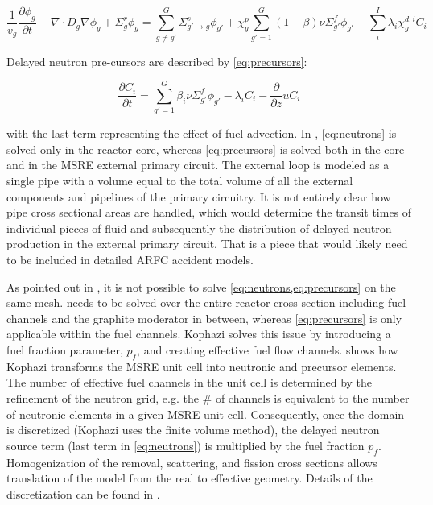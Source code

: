 \documentclass{article}
\begin{document}
\begin{equation}
\frac{1}{v_g}\frac{\partial \phi_g}{\partial t} - \nabla \cdot D_g \nabla \phi_g
+ \Sigma_g^r \phi_g = \sum_{g \ne g'}^G \Sigma_{g'\rightarrow g}^s \phi_{g'} + \chi_g^p \sum_{g' = 1}^G (1 - \beta)
\nu \Sigma_{g'}^f \phi_{g'} + \sum_i^I \lambda_i \chi_g^{d,i} C_i
\label{eq:neutrons}
\end{equation}

Delayed neutron pre-cursors are described by \cref{eq:precursors}:

\begin{equation}
\frac{\partial C_i}{\partial t} = \sum_{g'= 1}^G \beta_i \nu \Sigma_{g'}^f
\phi_{g'} - \lambda_i C_i - \frac{\partial}{\partial z} u C_i
\label{eq:precursors}
\end{equation}

with the last term representing the effect of fuel advection. In
\cite{kophazi_development_????}, \cref{eq:neutrons} is solved only in the
reactor core, whereas \cref{eq:precursors} is solved both in the core and in the
MSRE external primary circuit. The external loop is modeled as a single pipe
with a volume equal to the total volume of all the external components and
pipelines of the primary circuitry. \cite{kophazi_development_????} It is not
entirely clear how pipe cross sectional areas are handled, which would determine
the transit times of individual pieces of fluid and subsequently the
distribution of delayed neutron production in the external primary circuit. That
is a piece that would likely need to be included in detailed ARFC accident
models.

As pointed out in \cite{kophazi_development_????}, it is not possible to solve
\cref{eq:neutrons,eq:precursors} on the same mesh.  needs to
be solved over the entire reactor cross-section including fuel channels and the
graphite moderator in between, whereas \cref{eq:precursors} is only applicable
within the fuel channels. Kophazi solves this issue by introducing a fuel
fraction parameter, $p_f$, and creating effective fuel flow
channels.  shows how Kophazi transforms the MSRE unit
cell into neutronic and precursor elements. The number of effective fuel
channels in the unit cell is determined by the refinement of the neutron grid,
e.g. the \# of channels is equivalent to the number of neutronic elements in a
given MSRE unit cell. Consequently, once the domain is discretized (Kophazi uses
the finite volume method), the delayed neutron source term (last term in
\cref{eq:neutrons}) is multiplied by the fuel fraction $p_f$. Homogenization of
the removal, scattering, and fission cross sections allows translation of the
model from the real to effective geometry. Details of the discretization can be
found in \cite{kophazi_development_????}.
\end{document}
